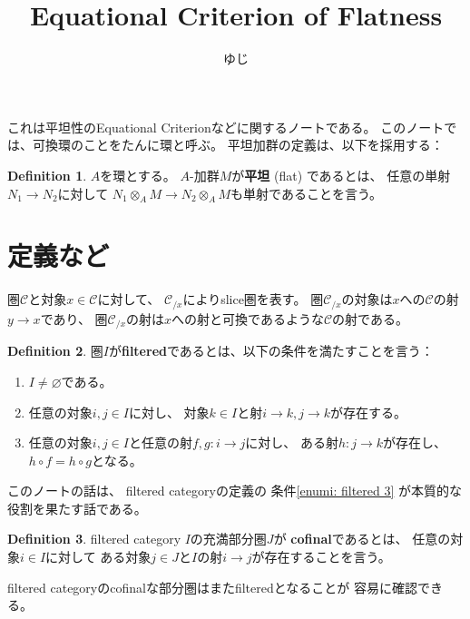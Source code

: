 \documentclass[uplatex]{jsarticle}
\title{Equational Criterion of Flatness}
\author{ゆじ}
\theoremstyle{definition}
\newtheorem{defi}[defi]{Definition}
\renewcommand{\emptyset}{\varnothing}
\newcommand{\mcC}{\mathcal{C}}
\begin{document}
\maketitle

これは平坦性のEquational Criterionなどに関するノートである。
このノートでは、可換環のことをたんに環と呼ぶ。
平坦加群の定義は、以下を採用する：

\begin{defi}
  \(A\)を環とする。
  \(A\)-加群\(M\)が\textbf{平坦} (flat) であるとは、
  任意の単射\(N_1\to N_2\)に対して
  \(N_1\otimes_AM\to N_2\otimes_AM\)も単射であることを言う。
\end{defi}


\section{定義など}

圏\(\mcC\)と対象\(x\in \mcC\)に対して、
\(\mcC_{/x}\)によりslice圏を表す。
圏\(\mcC_{/x}\)の対象は\(x\)への\(\mcC\)の射\(y\to x\)であり、
圏\(\mcC_{/x}\)の射は\(x\)への射と可換であるような\(\mcC\)の射である。

\begin{defi}\label{defi: filtered}
  圏\(I\)が\textbf{filtered}であるとは、以下の条件を満たすことを言う：
  \begin{enumerate}
    \item
    \(I\neq \emptyset\)である。
    \item
    任意の対象\(i,j\in I\)に対し、
    対象\(k\in I\)と射\(i\to k, j\to k\)が存在する。
    \item \label{enumi: filtered 3}
    任意の対象\(i,j\in I\)と任意の射\(f,g:i\to j\)に対し、
    ある射\(h:j\to k\)が存在し、
    \(h\circ f = h\circ g\)となる。
  \end{enumerate}
\end{defi}

このノートの話は、
filtered categoryの定義の
条件\ref{enumi: filtered 3}
が本質的な役割を果たす話である。

\begin{defi}
  filtered category \(I\)の充満部分圏\(J\)が
  \textbf{cofinal}であるとは、
  任意の対象\(i\in I\)に対して
  ある対象\(j\in J\)と\(I\)の射\(i\to j\)が存在することを言う。
\end{defi}

filtered categoryのcofinalな部分圏はまたfilteredとなることが
容易に確認できる。
\end{document}
